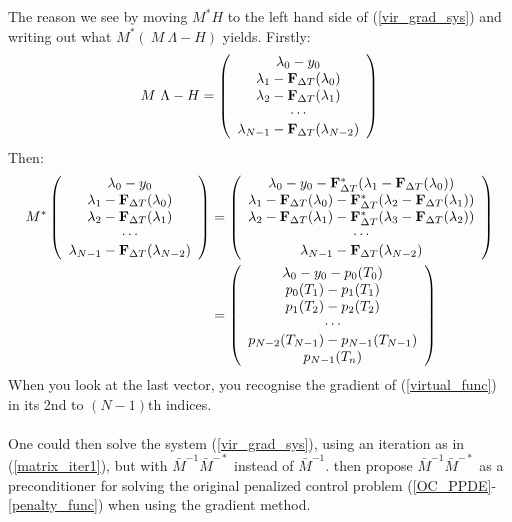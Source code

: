 \documentclass[11pt,a4paper]{article}
\begin{document}
The reason we see by moving $M^*H$ to the left hand side of (\ref{vir_grad_sys}) and writing out what $M^*( \ M \ \Lambda-H)$ yields. Firstly:
\begin{align}
M \ \Lambda - H = \left( \begin{array}{c}
	\lambda_0 -y_0 \\
	\lambda_1 - \bold{F}_{\Delta T}(\lambda_0)\\
	\lambda_2 - \bold{F}_{\Delta T}(\lambda_1) \\
	\cdots \\
	\lambda_{N-1} -\bold{F}_{\Delta T}(\lambda_{N-2})
	\end{array} \right)
\end{align}
Then:
\begin{align}
M^*\left( \begin{array}{c}
	\lambda_0-y_0 \\
	\lambda_1 - \bold{F}_{\Delta T}(\lambda_0)\\
	\lambda_2 - \bold{F}_{\Delta T}(\lambda_1) \\
	\cdots \\
	\lambda_{N-1} -\bold{F}_{\Delta T}(\lambda_{N-2})
	\end{array} \right) &=
	\left( \begin{array}{c}
	\lambda_0-y_0 -\bold{F}_{\Delta T}^*(\lambda_1 -\bold{F}_{\Delta T}(\lambda_0))\\
	\lambda_1 -\bold{F}_{\Delta T}(\lambda_0) -\bold{F}_{\Delta T}^*(\lambda_2 - \bold{F}_{\Delta T}(\lambda_1))\\
	\lambda_2 - \bold{F}_{\Delta T}(\lambda_1) -\bold{F}_{\Delta T}^*(\lambda_3 - \bold{F}_{\Delta T}(\lambda_2))\\
	\cdots \\
	\lambda_{N-1} -\bold{F}_{\Delta T}(\lambda_{N-2})
	\end{array} \right)
	\\
	&=\left( \begin{array}{c}
	\lambda_0-y_0 - p_0(T_0)\\
	p_0(T_1)-p_1(T_1)\\
	p_1(T_2)-p_2(T_2)\\
	\cdots \\
	p_{N-2}(T_{N-1})-p_{N-1}(T_{N-1}) \\
	p_{N-1}(T_n)
	\end{array} \right)
\end{align}
When you look at the last vector, you recognise the gradient of (\ref{virtual_func}) in its 2nd to $(N-1)$th indices.
\\
\\ 
One could then solve the system (\ref{vir_grad_sys}), using an iteration as in (\ref{matrix_iter1}), but with $\bar{M}^{-1}\bar{M}^{-*}$ instead of $\bar{M}^{-1}$. \cite{maday2002parareal} then propose $\bar{M}^{-1}\bar{M}^{-*}$ as a preconditioner for solving the original penalized control problem (\ref{OC_PPDE}-\ref{penalty_func}) when using the gradient method. 
\end{document}
